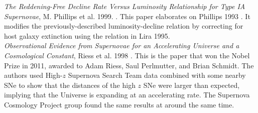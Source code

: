 \noindent\textit{The Reddening-Free Decline Rate Versus Luminosity Relationship for Type IA Supernovae}, M. Phillips et al. 1999. \cite{Phillips1999}. This paper elaborates on Phillips 1993 \cite{Phillips1993}. It modifies the previously-described luminosity-decline relation by correcting for host galaxy extinction using the relation in Lira 1995.\\

\noindent\textit{Observational Evidence from Supernovae for an Accelerating Universe and a Cosmological Constant}, Riess et al. 1998 \cite{Riess1998}. This is the paper that won the Nobel Prize in 2011, awarded to Adam Riess, Saul Perlmutter, and Brian Schmidt. The authors used High-$z$ Supernova Search Team data combined with some nearby SNe to show that the distances of the high $z$ SNe were larger than expected, implying that the Universe is expanding at an accelerating rate. The Supernova Cosmology Project group found the same results at around the same time.\\